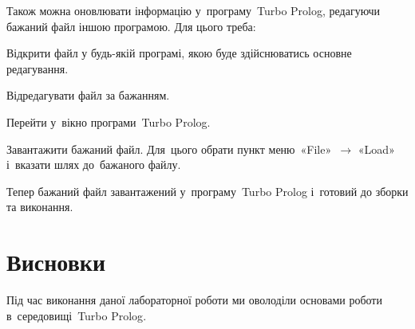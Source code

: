 \documentclass[
	a4paper,
	oneside,
	BCOR = 10mm,
	DIV = 12,
	12pt,
	headings = normal,
]{scrartcl}
\newcommand{\Mytextrightarrow}{$\rightarrow$}
\begin{document}
			Також можна оновлювати інформацію у~програму~\textenglish{Turbo Prolog}, редагуючи бажаний файл іншою програмою. Для цього треба:
			\begin{steps}
				\item Відкрити файл у будь-якій програмі, якою буде здійснюватись основне редагування. 
				\item Відредагувати файл за бажанням.
				\item Перейти у~вікно програми~\textenglish{Turbo Prolog}.
				\item Завантажити бажаний файл. Для~цього обрати пункт меню~«\textenglish{File}»~\Mytextrightarrow{ } «\textenglish{Load}» і~вказати шлях до~бажаного файлу. 
			\end{steps}
			Тепер бажаний файл завантажений у~програму~\textenglish{Turbo Prolog} і~готовий до зборки та виконання. 

	\section{Висновки}
		Під час виконання даної лабораторної роботи ми оволоділи основами роботи в~середовищі~\textenglish{Turbo Prolog}. 
\end{document}
